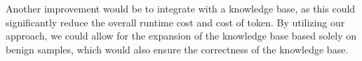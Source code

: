 Another improvement would be to integrate with a knowledge base, as this could significantly reduce the overall runtime cost and cost of token. By utilizing our approach, we could allow for the expansion of the knowledge base based solely on benign samples, which would also ensure the correctness of the knowledge base.




